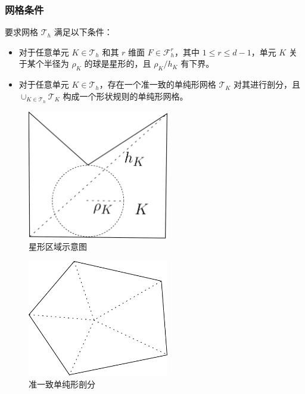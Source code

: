 \documentclass[notheorems,serif]{beamer}
\begin{document}
\begin{frame}
  \frametitle{网格条件}
  要求网格 $\mathcal{T}_h$ 满足以下条件：
  \begin{itemize}
    \item 对于任意单元 $K \in \mathcal{T}_h$ 和其 $r$ 维面 $F \in \mathcal{F}_h^r$，其中 $1 \leq r \leq d-1$，单元 $K$ 关于某个半径为 $\rho_K$ 的球是星形的，且 $\rho_K / h_K$ 有下界。
    \item 对于任意单元 $K \in \mathcal{T}_h$，存在一个准一致的单纯形网格 $\mathcal{T}_K$ 对其进行剖分，且 $\cup_{K \in \mathcal{T}_h} \mathcal{T}_K$ 构成一个形状规则的单纯形网格。
  \end{itemize}
  \vspace{10pt}
\begin{minipage}[b]{0.49\linewidth}
    \begin{figure}[htpb]
      \centering
      \includegraphics[width=0.55\textwidth]{../figures/star-shaped.pdf}
      \caption{星形区域示意图}
    \end{figure}
\end{minipage}
\hfill
\begin{minipage}[b]{0.49\linewidth}
    \centering
    \begin{figure}[htpb]
        \centering
        \includegraphics[width=0.55\textwidth]{../figures/splite_polygon.pdf}
        \caption{准一致单纯形剖分}
    \end{figure}
\end{minipage}
\end{frame}
\end{document}
